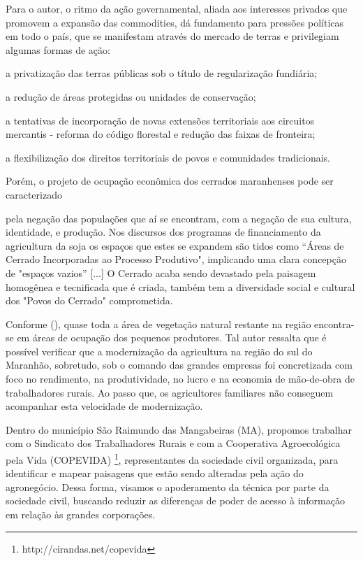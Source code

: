 Para o autor, o ritmo da ação governamental, aliada aos interesses privados que promovem a expansão das commodities, dá fundamento para pressões políticas em todo o país, que se manifestam através do mercado de terras e privilegiam algumas formas de ação:

\begin{alineas}
   \item a privatização das terras públicas sob o título de regularização fundiária;
   \item a redução de áreas protegidas ou unidades de conservação;
   \item a tentativas de incorporação de novas extensões territoriais aos circuitos mercantis - reforma do código florestal e redução das faixas de fronteira;
   \item a flexibilização dos direitos territoriais de povos e comunidades tradicionais.
\end{alineas}

Porém, o projeto de ocupação econômica dos cerrados maranhenses pode ser caracterizado

\begin{citacao}
pela negação das populações que aí se encontram, com a negação de sua cultura, identidade, e produção. Nos discursos dos programas de financiamento da agricultura da soja os espaços que estes se expandem são tidos como “Áreas de Cerrado Incorporadas ao Processo Produtivo", implicando uma clara concepção de "espaços vazios” [...] O Cerrado acaba sendo devastado pela paisagem homogênea e tecnificada que é criada,  também tem a diversidade social e cultural dos "Povos do Cerrado" comprometida. \cite[p. 13]{rodrigues_alencar}
\end{citacao}

Conforme  (\citeyear{studte2008}), quase toda a área de vegetação natural restante na região encontra-se em áreas de ocupação dos pequenos produtores. Tal autor ressalta que é possível verificar que a modernização  da  agricultura na  região do sul do Maranhão, sobretudo, sob o comando  das grandes empresas foi concretizada  com foco no rendimento,  na produtividade, no lucro e na economia de mão-de-obra de trabalhadores rurais.  Ao passo que, os agricultores familiares não conseguem acompanhar esta velocidade de modernização.

Dentro do município São Raimundo das Mangabeiras (MA), propomos trabalhar com o Sindicato dos Trabalhadores Rurais e com a Cooperativa Agroecológica pela Vida (COPEVIDA) \footnote{http://cirandas.net/copevida}, representantes da sociedade civil organizada, para identificar e mapear paisagens que estão sendo alteradas pela ação do agronegócio. Dessa forma, visamos o apoderamento da técnica por parte da sociedade civil, buscando reduzir as diferenças de poder de acesso à informação em relação às grandes corporações.

